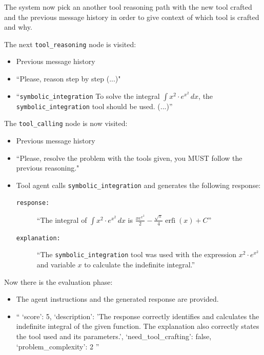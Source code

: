 \documentclass[12pt,a4paper,openright,twoside]{book}
\begin{document}
The system now pick an another tool reasoning path with the new tool crafted and the previous message history in order to give context of which tool is crafted and why.

The next \texttt{tool\_reasoning} node is visited:
\begin{itemize}
    \item[\textbf{PMH:}] Previous message history
    \item[\textbf{Node Prompt:}] ``Please, reason step by step (...)"
    \item[\textbf{AI:}] ``\texttt{symbolic\_integration} To solve the integral $\int x^2 \cdot e^{x^2} \, dx$, the \texttt{symbolic\_integration} tool should be used. (...)''
\end{itemize}

The \texttt{tool\_calling} node is now visited:

\begin{itemize}
    \item[\textbf{PMH:}] Previous message history
    \item[\textbf{System:}] ``Please, resolve the problem with the tools given, you MUST follow the previous reasoning."
    \item[\textbf{AI:}] Tool agent calls \texttt{symbolic\_integration} and generates the following response:
    \begin{description}
        \item[\texttt{response:}] ``The integral of $\int x^2 \cdot e^{x^2} \, dx$ is $\frac{x e^{x^2}}{2} - \frac{\sqrt{\pi}}{4} \operatorname{erfi}(x) + C$'' 
        \item[\texttt{explanation:}] ``The \texttt{symbolic\_integration} tool was used with the expression $x^2 \cdot e^{x^2}$ and variable $x$ to calculate the indefinite integral.''
    \end{description}
\end{itemize}

Now there is the evaluation phase:
\begin{itemize}
    \item[\textbf{Instructions:}] The agent instructions and the generated response are provided.
    \item[\textbf{AI:}] ``{ `score': 5, `description': 'The response correctly identifies and calculates the indefinite integral of the given function. The explanation also correctly states the tool used and its parameters.', `need\_tool\_crafting': false, `problem\_complexity': 2 }''
\end{itemize}
\end{document}
